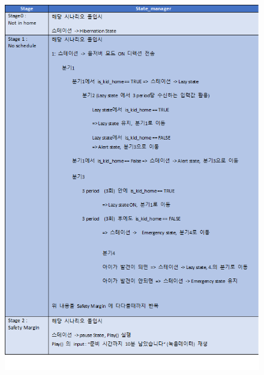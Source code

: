 \documentclass[conference]{IEEEtran}
\begin{document}
\begin{enumerate}[label=\arabic*.]
\begin{enumerate}[label=\arabic*.]
\begin{enumerate}[label=\alph*.]
        \begin{figure}[H]\centering\includegraphics[scale=0.335]{images/rule1.png}\end{figure}

\end{enumerate}
\end{enumerate}
\end{enumerate}
\end{document}
